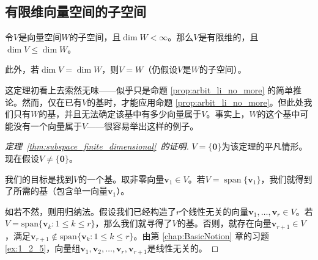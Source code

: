 \subsection{有限维向量空间的子空间}

\begin{theorem}\label{thm:subspace_finite_dimensional}
  令$V$是向量空间$W$的子空间，且$\dim W < \infty$。那么$V$是有限维的，且$\dim V\le \dim W$。

  此外，若$\dim V= \dim W$，则$V=W$（仍假设$V$是$W$的子空间）。
\end{theorem}
\begin{remark*}
  这定理初看上去索然无味——似乎只是命题 \ref{prop:arbit_li_no_more} 的简单推论。然而，仅在已有$V$的基时，才能应用命题 \ref{prop:arbit_li_no_more}。但此处我们只有$W$的基，并且无法确定该基中有多少向量属于$V$。事实上，$W$的这个基中可能没有一个向量属于$V$——很容易举出这样的例子。
\end{remark*}

\begin{proof}[定理~\ref{thm:subspace_finite_dimensional}~的证明]
  $V = \{\mathbf{0}\}$为该定理的平凡情形。现在假设$V \ne \{\mathbf{0}\}$。

  我们的目标是找到$V$的一个基。取非零向量$\mathbf{v}_1\in V$。若$V=\operatorname{span}\{\mathbf{v}_1\}$，我们就得到了所需的基（包含单一向量$\mathbf{v}_1$）。

  如若不然，则用归纳法。假设我们已经构造了$r$个线性无关的向量$\mathbf{v}_{1},\ldots,\mathbf{v}_{r}\in V$。若$V=\mathrm{span}\{\mathbf{v}_{k}:1\leq k\leq r\}$，那么我们就寻得了$V$的基。否则，就存在向量$\mathbf{v}_{r+1}\in V$，满足$\mathbf{v}_{r+1}\notin\mathrm{span}\{\mathbf{v}_{k}:1\leq k\leq r\}$。由第 \ref{chap:BasicNotion} 章的习题 \ref{ex:1_2_5}，向量组$\mathbf{v}_1,\mathbf{v}_2,\ldots,\mathbf{v}_r,\mathbf{v}_{r+1}$是线性无关的。
\end{proof}

